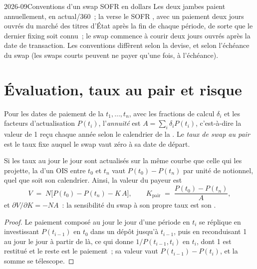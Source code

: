 \begin{dated}{2026-09}{Conventions d'un swap SOFR en dollars}\label{dat:m2:interest-rate-swaps:conventions}
Les deux jambes paient annuellement, en actual/360~; la  verse le SOFR , avec un paiement deux jours ouvrés du marché des titres d'État après la fin de
chaque période, de sorte que le dernier fixing soit connu~; le swap commence à courir deux
jours ouvrés après la date de transaction. Les conventions diffèrent selon la devise, et selon
l'échéance du swap (les swaps courts peuvent ne payer qu'une fois, à l'échéance).
\end{dated}

\section{Évaluation, taux au pair et risque}

\begin{definition}\label{def:m2:interest-rate-swaps:par}
Pour les dates de paiement de la  $t_1, \dots, t_n$, avec les fractions de calcul $\delta_i$
et les facteurs d'actualisation $P(t_i)$, l'\emph{annuité} est $A =
\sum_i \delta_i P(t_i)$, c'est-à-dire la valeur de 1 reçu chaque année selon le calendrier
de la . Le \emph{taux de swap au pair} est le taux fixe auquel le swap
vaut zéro à sa date de départ.
\end{definition}

\begin{proposition}\label{prop:m2:interest-rate-swaps:value}
Si les taux au jour le jour sont actualisés sur la même courbe que celle qui les projette, la
 d'un OIS entre $t_0$ et $t_n$ vaut $P(t_0) - P(t_n)$ par unité
de notionnel, quel que soit son calendrier. Ainsi, la valeur du payeur est
\[
V \;=\; N\bigl[P(t_0) - P(t_n) - K\,A\bigr],
\qquad
K_{\text{pair}} \;=\; \frac{P(t_0) - P(t_n)}{A},
\]
et $\partial V/\partial K = -N A$~: la sensibilité du swap à son propre taux est
son .
\end{proposition}
\begin{proof}
Le paiement composé au jour le jour d'une période en $t_i$ se réplique en investissant
$P(t_{i-1})$ en $t_0$ dans un dépôt jusqu'à $t_{i-1}$, puis en reconduisant 1 au jour le jour
à partir de là, ce qui donne $1/P(t_{i-1}, t_i)$ en $t_i$, dont 1 est restitué et le
reste est le paiement~; sa valeur vaut $P(t_{i-1}) - P(t_i)$, et la somme se télescope.
\end{proof}

